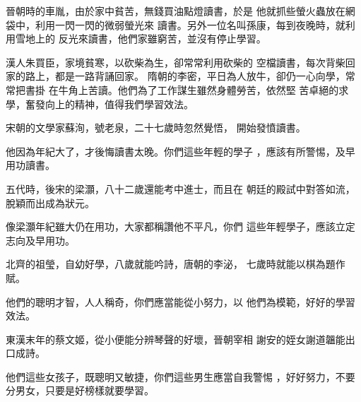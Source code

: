 \documentclass[avery5371,grid]{flashcards}
\begin{document}
{晉朝時的車胤，由於家中貧苦，無錢買油點燈讀書，於是
他就抓些螢火蟲放在網袋中，利用一閃一閃的微弱螢光來
讀書。另外一位名叫孫康，每到夜晚時，就利用雪地上的
反光來讀書，他們家雖窮苦，並沒有停止學習。} %
{} %






{漢人朱買臣，家境貧寒，以砍柴為生，卻常常利用砍柴的
空檔讀書，每次背柴回家的路上，都是一路背誦回家。
隋朝的李密，平日為人放牛，卻仍一心向學，常常把書掛
在牛角上苦讀。他們為了工作謀生雖然身體勞苦，依然堅
苦卓絕的求學，奮發向上的精神，值得我們學習效法。} %
{} %

{宋朝的文學家蘇洵，號老泉，二十七歲時忽然覺悟，
開始發憤讀書。} %
{} %

{他因為年紀大了，才後悔讀書太晚。你們這些年輕的學子
，應該有所警惕，及早用功讀書。} %
{} %

{五代時，後宋的梁灝，八十二歲還能考中進士，而且在
朝廷的殿試中對答如流，脫穎而出成為狀元。} %
{} %

{像梁灝年紀雖大仍在用功，大家都稱讚他不平凡，你們
這些年輕學子，應該立定志向及早用功。} %
{} %

{北齊的祖瑩，自幼好學，八歲就能吟詩，唐朝的李泌，
七歲時就能以棋為題作賦。} %
{} %






{他們的聰明才智，人人稱奇，你們應當能從小努力，以
他們為模範，好好的學習效法。} %
{} %

{東漢末年的蔡文姬，從小便能分辨琴聲的好壞，晉朝宰相
謝安的姪女謝道韞能出口成詩。} %
{} %

{他們這些女孩子，既聰明又敏捷，你們這些男生應當自我警惕
，好好努力，不要分男女，只要是好榜樣就要學習。} %
{} %
\end{document}
